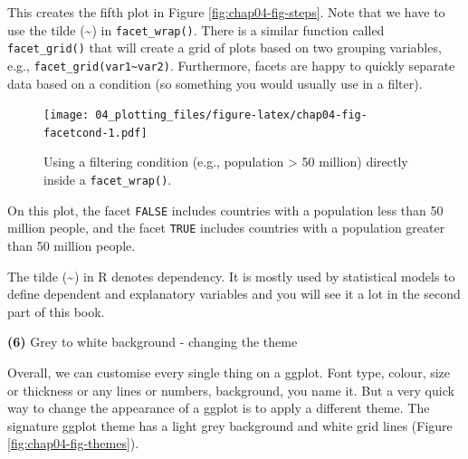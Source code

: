 \documentclass[
  12pt,
  krantz2]{krantz}
\makeatletter
\newenvironment{Shaded}{\begin{snugshade}}{\end{snugshade}}
\newcommand{\DataTypeTok}[1]{\textcolor[rgb]{0.13,0.29,0.53}{#1}}
\newcommand{\DecValTok}[1]{\textcolor[rgb]{0.00,0.00,0.81}{#1}}
\newcommand{\KeywordTok}[1]{\textcolor[rgb]{0.13,0.29,0.53}{\textbf{#1}}}
\newcommand{\NormalTok}[1]{#1}
\newcommand{\OperatorTok}[1]{\textcolor[rgb]{0.81,0.36,0.00}{\textbf{#1}}}
\newcommand{\StringTok}[1]{\textcolor[rgb]{0.31,0.60,0.02}{#1}}
\newenvironment{kframe}{%
\medskip{}
\setlength{\fboxsep}{.8em}
 \def\at@end@of@kframe{}%
 \ifinner\ifhmode%
  \def\at@end@of@kframe{\end{minipage}}%
  \begin{minipage}{\columnwidth}%
 \fi\fi%
 \def\FrameCommand##1{\hskip\@totalleftmargin \hskip-\fboxsep
 \colorbox{shadecolor}{##1}\hskip-\fboxsep
     \hskip-\linewidth \hskip-\@totalleftmargin \hskip\columnwidth}%
 \MakeFramed {\advance\hsize-\width
   \@totalleftmargin\z@ \linewidth\hsize
   \@setminipage}}%
 {\par\unskip\endMakeFramed%
 \at@end@of@kframe}
\renewenvironment{Shaded}{\begin{kframe}}{\end{kframe}}
\makeatother
\begin{document}
This creates the fifth plot in Figure \ref{fig:chap04-fig-steps}.
Note that we have to use the tilde (\textasciitilde) in \texttt{facet\_wrap()}.
There is a similar function called \texttt{facet\_grid()} that will create a grid of plots based on two grouping variables, e.g., \texttt{facet\_grid(var1\textasciitilde{}var2)}.
Furthermore, facets are happy to quickly separate data based on a condition (so something you would usually use in a filter).

\begin{Shaded}
\end{Shaded}

\begin{figure}
\centering
\texttt{[image: 04\_plotting\_files/figure-latex/chap04-fig-facetcond-1.pdf]}
\caption{\label{fig:chap04-fig-facetcond}Using a filtering condition (e.g., population \textgreater{} 50 million) directly inside a \texttt{facet\_wrap()}.}
\end{figure}

On this plot, the facet \texttt{FALSE} includes countries with a population less than 50 million people, and the facet \texttt{TRUE} includes countries with a population greater than 50 million people.

The tilde (\textasciitilde) in R denotes dependency.
It is mostly used by statistical models to define dependent and explanatory variables and you will see it a lot in the second part of this book.

\textbf{(6)} Grey to white background - changing the theme

Overall, we can customise every single thing on a ggplot.
Font type, colour, size or thickness or any lines or numbers, background, you name it.
But a very quick way to change the appearance of a ggplot is to apply a different theme.
The signature ggplot theme has a light grey background and white grid lines (Figure \ref{fig:chap04-fig-themes}).
\end{document}
